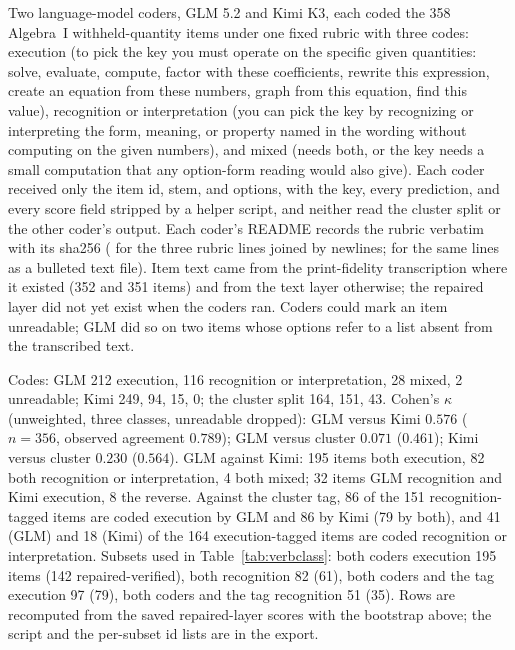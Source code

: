 Two language-model coders, GLM 5.2 and Kimi K3, each coded the 358 Algebra~I withheld-quantity items under one fixed rubric with three codes: execution (to pick the key you must operate on the specific given quantities: solve, evaluate, compute, factor with these coefficients, rewrite this expression, create an equation from these numbers, graph from this equation, find this value), recognition or interpretation (you can pick the key by recognizing or interpreting the form, meaning, or property named in the wording without computing on the given numbers), and mixed (needs both, or the key needs a small computation that any option-form reading would also give). Each coder received only the item id, stem, and options, with the key, every prediction, and every score field stripped by a helper script, and neither read the cluster split or the other coder's output. Each coder's README records the rubric verbatim with its sha256 ( for the three rubric lines joined by newlines;  for the same lines as a bulleted text file). Item text came from the print-fidelity transcription where it existed (352 and 351 items) and from the text layer otherwise; the repaired layer did not yet exist when the coders ran. Coders could mark an item unreadable; GLM did so on two items whose options refer to a list absent from the transcribed text.

Codes: GLM 212 execution, 116 recognition or interpretation, 28 mixed, 2 unreadable; Kimi 249, 94, 15, 0; the cluster split 164, 151, 43. Cohen's $\kappa$ (unweighted, three classes, unreadable dropped): GLM versus Kimi $0.576$ ($n=356$, observed agreement $0.789$); GLM versus cluster $0.071$ ($0.461$); Kimi versus cluster $0.230$ ($0.564$). GLM against Kimi: 195 items both execution, 82 both recognition or interpretation, 4 both mixed; 32 items GLM recognition and Kimi execution, 8 the reverse. Against the cluster tag, 86 of the 151 recognition-tagged items are coded execution by GLM and 86 by Kimi (79 by both), and 41 (GLM) and 18 (Kimi) of the 164 execution-tagged items are coded recognition or interpretation. Subsets used in Table~\ref{tab:verbclass}: both coders execution 195 items (142 repaired-verified), both recognition 82 (61), both coders and the tag execution 97 (79), both coders and the tag recognition 51 (35). Rows are recomputed from the saved repaired-layer scores with the bootstrap above; the script and the per-subset id lists are in the export.

